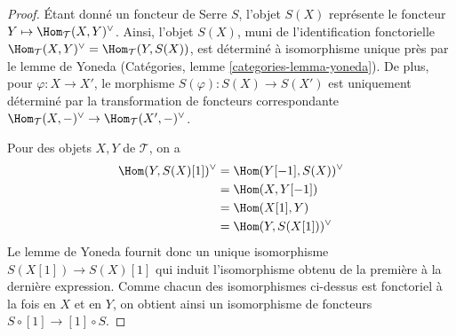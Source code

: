 \begin{proof}
Étant donné un foncteur de Serre $S$, l'objet $S(X)$ représente
le foncteur $Y \mapsto \Hom_\mathcal{T}(X, Y)^\vee$.
Ainsi, l'objet $S(X)$, muni de l'identification fonctorielle
$\Hom_\mathcal{T}(X, Y)^\vee = \Hom_\mathcal{T}(Y, S(X))$,
est déterminé à isomorphisme unique près par le lemme de Yoneda
(Catégories, lemme \ref{categories-lemma-yoneda}).
De plus, pour $\varphi : X \to X'$, le morphisme $S(\varphi) : S(X) \to S(X')$
est uniquement déterminé par la transformation de foncteurs correspondante
$\Hom_\mathcal{T}(X, -)^\vee \to \Hom_\mathcal{T}(X', -)^\vee$.

\medskip\noindent
Pour des objets $X, Y$ de $\mathcal{T}$, on a
\begin{align*}
\Hom(Y, S(X)[1])^\vee
& =
\Hom(Y[-1], S(X))^\vee \\
& =
\Hom(X, Y[-1]) \\
& =
\Hom(X[1], Y) \\
& =
\Hom(Y, S(X[1]))^\vee
\end{align*}
Le lemme de Yoneda fournit donc un unique isomorphisme
$S(X[1]) \to S(X)[1]$ qui induit l'isomorphisme obtenu de la première à la dernière expression.
Comme chacun des isomorphismes ci-dessus est fonctoriel à la fois en $X$ et en $Y$,
on obtient ainsi un isomorphisme de foncteurs
$S \circ [1] \to [1] \circ S$.


\end{proof}
